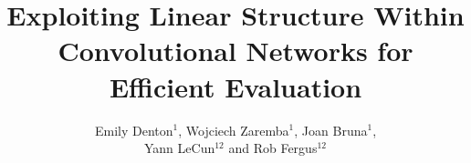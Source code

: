 \documentclass[runningheads]{llncs}
\begin{document}
\pagestyle{headings}
\mainmatter
\def\ECCV14SubNumber{966}  %

\title{Exploiting Linear Structure Within Convolutional Networks
  for Efficient Evaluation} %


\author{Emily Denton$^1$, Wojciech Zaremba$^1$, Joan Bruna$^1$, \\
Yann LeCun$^{12}$ and Rob Fergus$^{12}$}


\maketitle
\centerline{ }







\clearpage

\nocite{*}


\end{document}
